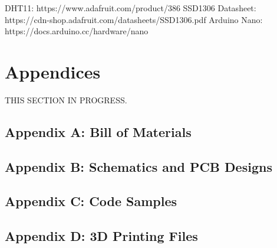 \documentclass{article}
\begin{document}
\begin{thebibliography}{X}
	 DHT11: https://www.adafruit.com/product/386
	 SSD1306 Datasheet: https://cdn-shop.adafruit.com/datasheets/SSD1306.pdf
	 Arduino Nano: https://docs.arduino.cc/hardware/nano
\end{thebibliography}	
	
		\section{Appendices}
		THIS SECTION IN PROGRESS.
		
		\subsection{Appendix A: Bill of Materials}
		
		\subsection{Appendix B: Schematics and PCB Designs}
		
		\subsection{Appendix C: Code Samples}
		
		\subsection{Appendix D: 3D Printing Files}
	
\end{document}
